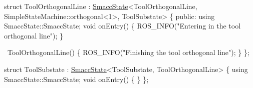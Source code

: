 \begin{DoxyCode}
\textcolor{keyword}{struct }ToolOrthogonalLine
    : \hyperlink{classSmaccState}{SmaccState}<ToolOrthogonalLine, SimpleStateMachine::orthogonal<1>, ToolSubstate> \{
\textcolor{keyword}{public}:
  \textcolor{keyword}{using} SmaccState::SmaccState;
  \textcolor{keywordtype}{void} onEntry()          
  \{
    ROS\_INFO(\textcolor{stringliteral}{"Entering in the tool orthogonal line"});
  \}

  ~ToolOrthogonalLine() 
  \{
    ROS\_INFO(\textcolor{stringliteral}{"Finishing the tool orthogonal line"}); 
  \}
\};

\textcolor{keyword}{struct }ToolSubstate : \hyperlink{classSmaccState}{SmaccState}<ToolSubstate, ToolOrthogonalLine> 
\{
    \textcolor{keyword}{using} SmaccState::SmaccState;
    \textcolor{keywordtype}{void} onEntry()
    \{
    \}
\};
\end{DoxyCode}
 
